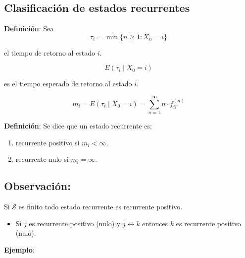 \documentclass[12pt,a4paper]{article}
\begin{document}
\subsection*{Clasificación de estados recurrentes}

\textbf{Definición}: Sea
\begin{equation*}
\tau_i = \min\{n \geq 1: X_n=i\}
\end{equation*}

el tiempo de retorno al estado $i$.

\begin{equation*}
E(\tau_i \mid X_0=i)
\end{equation*}

es el tiempo esperado de retorno al estado $i$.

\begin{equation*}
m_i = E(\tau_i \mid X_0=i) = \sum_{n=1}^{\infty} n \cdot f_{ii}^{(n)}
\end{equation*}

\textbf{Definición}: Se dice que un estado recurrente es:
\begin{enumerate}
    \item recurrente positivo si $m_i < \infty$.
    \item recurrente nulo si $m_i = \infty$.
\end{enumerate}

\subsection*{Observación:}
Si $\mathcal{S}$ es finito todo estado recurrente es recurrente positivo.

\begin{itemize}
    \item Si $j$ es recurrente positivo (nulo) y $j \leftrightarrow k$ entonces $k$ es recurrente positivo (nulo).
\end{itemize}

\textbf{Ejemplo}:

\begin{center}
\end{center}
\end{document}
